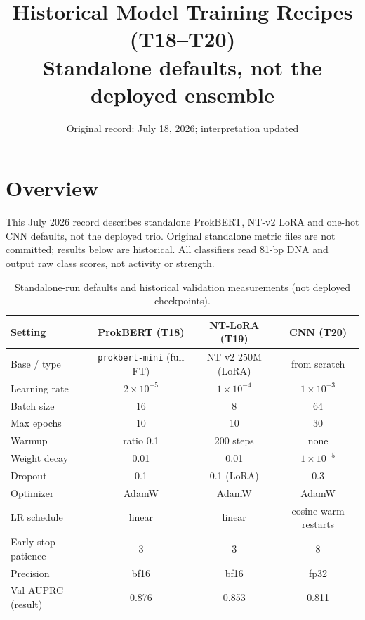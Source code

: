 \documentclass{article}
\title{Historical Model Training Recipes (T18--T20)\\ \large Standalone defaults, not the deployed ensemble}
\date{Original record: July 18, 2026; interpretation updated}
\author{}
\begin{document}
\maketitle

\section{Overview}
This July 2026 record describes standalone ProkBERT, NT-v2 LoRA and one-hot CNN defaults, not the deployed trio. Original standalone metric files are not committed; results below are historical. All classifiers read 81-bp DNA and output raw class scores, not activity or strength.

\begin{table}[h]
\centering
\caption{Standalone-run defaults and historical validation measurements (not deployed checkpoints).}
\begin{tabular}{lccc}
\toprule
Setting & ProkBERT (T18) & NT-LoRA (T19) & CNN (T20) \\
\midrule
Base / type        & \texttt{prokbert-mini} (full FT) & NT v2 250M (LoRA) & from scratch \\
Learning rate      & $2\times10^{-5}$ & $1\times10^{-4}$ & $1\times10^{-3}$ \\
Batch size         & 16 & 8 & 64 \\
Max epochs         & 10 & 10 & 30 \\
Warmup             & ratio 0.1 & 200 steps & none \\
Weight decay       & 0.01 & 0.01 & $1\times10^{-5}$ \\
Dropout            & 0.1 & 0.1 (LoRA) & 0.3 \\
Optimizer          & AdamW & AdamW & AdamW \\
LR schedule        & linear & linear & cosine warm restarts \\
Early-stop patience& 3 & 3 & 8 \\
Precision          & bf16 & bf16 & fp32 \\
\midrule
Val AUPRC (result) & 0.876 & 0.853 & 0.811 \\
\bottomrule
\end{tabular}
\end{table}
\end{document}
